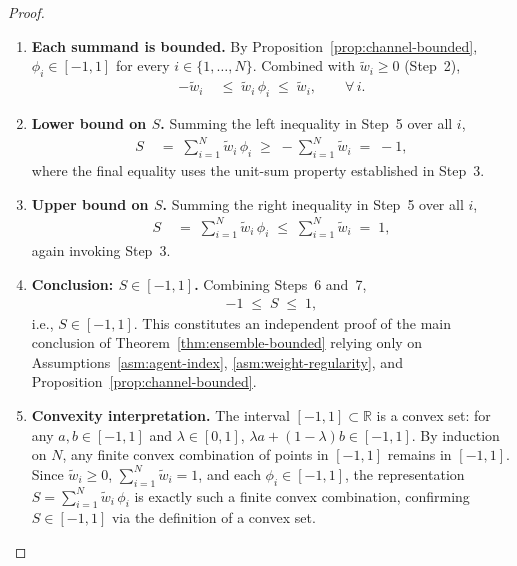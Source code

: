 \documentclass[12pt,openany]{book}
\numberwithin{equation}{chapter}
\theoremstyle{plain}
\theoremstyle{definition}
\theoremstyle{remark}
\numberwithin{equation}{chapter}
\theoremstyle{plain}
\begin{document}
\begin{proof}
\begin{enumerate}
  \item \textbf{Each summand is bounded.}
        By Proposition~\ref{prop:channel-bounded},
        $\phi_i \in [-1,1]$ for every
        $i \in \{1,\ldots,N\}$.
        Combined with $\tilde{w}_i \geq 0$ (Step~2),
        \begin{align}
          -\tilde{w}_i
          &\;\leq\;
          \tilde{w}_i\,\phi_i
          \;\leq\;
          \tilde{w}_i,
          \qquad \forall\, i.
        \end{align}

  \item \textbf{Lower bound on $S$.}
        Summing the left inequality in Step~5 over all $i$,
        \begin{align}
          S
          &\;=\; \sum_{i=1}^{N} \tilde{w}_i\,\phi_i
          \;\geq\; -\sum_{i=1}^{N} \tilde{w}_i
          \;=\; -1,
        \end{align}
        where the final equality uses the unit-sum property
        established in Step~3.

  \item \textbf{Upper bound on $S$.}
        Summing the right inequality in Step~5 over all $i$,
        \begin{align}
          S
          &\;=\; \sum_{i=1}^{N} \tilde{w}_i\,\phi_i
          \;\leq\; \sum_{i=1}^{N} \tilde{w}_i
          \;=\; 1,
        \end{align}
        again invoking Step~3.

  \item \textbf{Conclusion: $S \in [-1,1]$.}
        Combining Steps~6 and~7,
        \begin{align}
          -1 \;\leq\; S \;\leq\; 1,
        \end{align}
        i.e., $S \in [-1,1]$.  This constitutes an independent
        proof of the main conclusion of
        Theorem~\ref{thm:ensemble-bounded} relying only on
        Assumptions~\ref{asm:agent-index},
        \ref{asm:weight-regularity}, and
        Proposition~\ref{prop:channel-bounded}.

  \item \textbf{Convexity interpretation.}
        The interval $[-1,1] \subset \mathbb{R}$ is a convex set:
        for any $a, b \in [-1,1]$ and $\lambda \in [0,1]$,
        $\lambda a + (1-\lambda)b \in [-1,1]$.
        By induction on $N$, any finite convex combination of
        points in $[-1,1]$ remains in $[-1,1]$.
        Since $\tilde{w}_i \geq 0$,
        $\sum_{i=1}^{N}\tilde{w}_i = 1$, and each
        $\phi_i \in [-1,1]$, the representation
        $S = \sum_{i=1}^{N}\tilde{w}_i\,\phi_i$ is exactly
        such a finite convex combination, confirming
        $S \in [-1,1]$ via the definition of a convex set.


\end{enumerate}
\end{proof}
\end{document}
